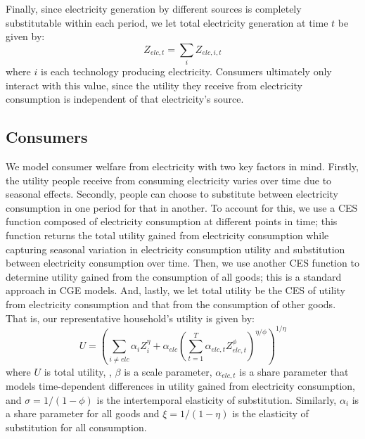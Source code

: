 \documentclass[12pt,a4paper]{extarticle}
\begin{document}
Finally, since electricity generation by different sources is completely substitutable within each period, we let total electricity generation at time $t$ be given by:
$$Z_{elc,t} = \sum_i Z_{elc,i,t}$$
where $i$ is each technology producing electricity. Consumers ultimately only interact with this value, since the utility they receive from electricity consumption is independent of that electricity's source. 

\subsection{Consumers}

We model consumer welfare from electricity with two key factors in mind. Firstly, the utility people receive from consuming electricity varies over time due to seasonal effects. Secondly, people can choose to substitute between electricity consumption in one period for that in another. To account for this, we use a CES function composed of electricity consumption at different points in time; this function returns the total utility gained from electricity consumption while capturing seasonal variation in electricity consumption utility and substitution between electricity consumption over time. Then, we use another CES function to determine utility gained from the consumption of all goods; this is a standard approach in CGE models. And, lastly, we let total utility be the CES of utility from electricity consumption and that from the consumption of other goods.  
That is, our representative household's utility is given by:
$$U =   \left( \sum_{i \neq elc} \alpha_{i} Z_{i}^\eta +  \alpha_{elc} \left( \sum_{t=1}^T \alpha_{elc,t} Z_{elc, t}^\phi \right)^{\eta/\phi} \right)^{1/\eta}$$
where $U$ is total utility, , $\beta$ is a scale parameter, $\alpha_{elc,t}$ is a share parameter that models time-dependent differences in utility gained from electricity consumption, and $\sigma = 1 / (1-\phi)$ is the intertemporal elasticity of substitution. Similarly, $\alpha_i$ is a share parameter for all goods and $\xi = 1 / (1-\eta)$ is the elasticity of substitution for all consumption. 
\end{document}
